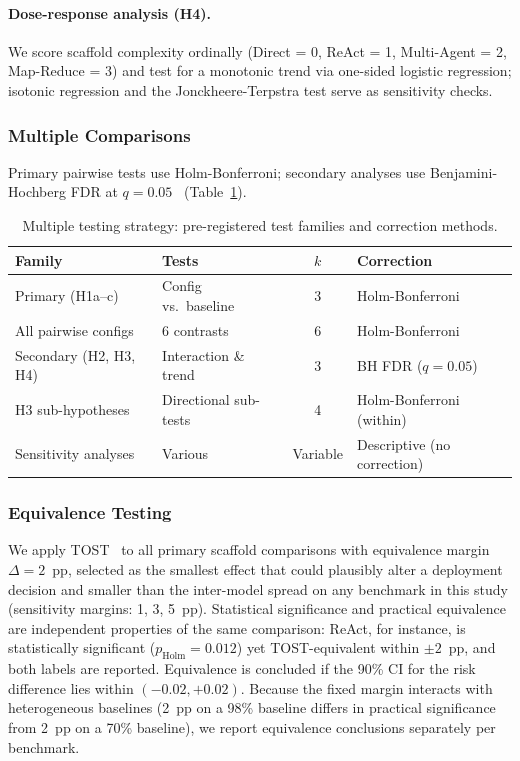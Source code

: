 \documentclass[preprint]{article}
\begin{document}
\paragraph{Dose-response analysis (H4).} We score scaffold complexity ordinally (Direct = 0, ReAct = 1, Multi-Agent = 2, Map-Reduce = 3) and test for a monotonic trend via one-sided logistic regression; isotonic regression and the Jonckheere-Terpstra test serve as sensitivity checks.

\subsubsection{Multiple Comparisons}

Primary pairwise tests use Holm-Bonferroni; secondary analyses use Benjamini-Hochberg FDR at $q = 0.05$~\cite{benjamini1995fdr} (Table~\ref{tab:multiple-testing}).

\begin{table}[h]
\caption{Multiple testing strategy: pre-registered test families and correction methods.}
\label{tab:multiple-testing}
\centering
\small
\begin{tabular}{@{}ll@{\quad}c@{\quad}l@{}}
\toprule
\textbf{Family} & \textbf{Tests} & \textbf{$k$} & \textbf{Correction} \\
\midrule
Primary (H1a--c) & Config vs.\ baseline & 3 & Holm-Bonferroni \\
All pairwise configs & 6 contrasts & 6 & Holm-Bonferroni \\
Secondary (H2, H3, H4) & Interaction \& trend & 3 & BH FDR ($q = 0.05$) \\
H3 sub-hypotheses & Directional sub-tests & 4 & Holm-Bonferroni (within) \\
Sensitivity analyses & Various & Variable & Descriptive (no correction) \\
\bottomrule
\end{tabular}
\end{table}

\subsubsection{Equivalence Testing}

We apply TOST~\cite{schuirmann1987tost, lakens2017equivalence} to all primary scaffold comparisons with equivalence margin $\Delta = 2$~pp, selected as the smallest effect that could plausibly alter a deployment decision and smaller than the inter-model spread on any benchmark in this study (sensitivity margins: 1, 3, 5~pp).  Statistical significance and practical equivalence are independent properties of the same comparison: ReAct, for instance, is statistically significant ($p_{\text{Holm}} = 0.012$) yet TOST-equivalent within $\pm 2$~pp, and both labels are reported.  Equivalence is concluded if the 90\% CI for the risk difference lies within $(-0.02, +0.02)$.  Because the fixed margin interacts with heterogeneous baselines (2~pp on a 98\% baseline differs in practical significance from 2~pp on a 70\% baseline), we report equivalence conclusions separately per benchmark.
\end{document}
